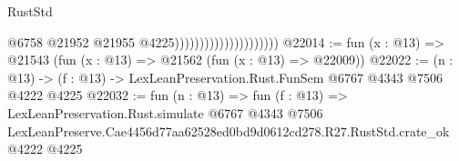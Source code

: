 \begin{lexlean}{RustStd}
\begin{coremodule}
                                              @6758
                                              @21952
                                              @21955
                                              @4225)))))))))))))))))))))
@22014 := fun (x : @13) => @21543 (fun (x : @13) => @21562 (fun (x : @13) => @22009))
@22022 := (n : @13) -> (f : @13) -> LexLeanPreservation.Rust.FunSem @6767 @4343 @7506 @4222 @4225
@22032 := fun (n : @13) =>
  fun (f : @13) =>
  LexLeanPreservation.Rust.simulate
    @6767
    @4343
    @7506
    LexLeanPreserve.Cae4456d77aa62528ed0bd9d0612cd278.R27.RustStd.crate_ok
    @4222
    @4225
\end{coremodule}
\end{lexlean}
